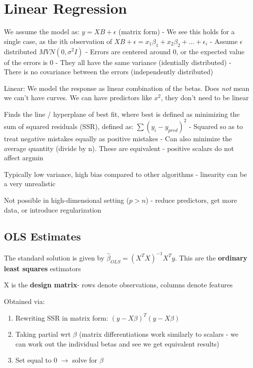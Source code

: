 \documentclass{article}
\begin{document}
\section{Linear Regression}

We assume the model as: $y = XB + \epsilon$ (matrix form)
	- We see this holds for a single case, as the ith observation of $XB + \epsilon = x_1 \beta_1 + x_2 \beta_2 + \ldots + \epsilon_i$
	- Assume $\epsilon$ distributed $MVN(0, \sigma^2 I)$
		- Errors are centered around 0, or the expected value of the errors is 0
		- They all have the same variance (identially distributed)
		- There is no covariance between the errors (independently distributed)

Linear: We model the response as linear combination of the betas. Does \textit{not} mean we can't have curves. We can have predictors like $x^2$, they don't need to be linear

Finds the line / hyperplane of best fit, where best is defined as minimizing the sum of squared residuals (SSR), defined as: $\sum (y_i - y_{pred}) ^ 2$
	- Squared so as to treat negative mistakes equally as positive mistakes
	- Can also minimize the average quantity (divide by n). These are equivalent - positive scalars do not affect argmin 
	
Typically low variance, high bias compared to other algorithms - linearity can be a very unrealistic 

Not possible in high-dimensional setting ($p > n$) - reduce predictors, get more data, or introduce regularization
	
\subsection{OLS Estimates}
The standard solution is given by $\hat{\beta}_{OLS} = (X^T X)^{-1} X^T y$. This are the \textbf{ordinary least squares} estimators

X is the \textbf{design matrix}- rows denote observations, columns denote features

Obtained via:
\begin{enumerate}
	\item  Rewriting SSR in matrix form: $(y - X\beta)^T (y - X\beta)$
	\item Taking partial wrt $\beta$ (matrix differentiations work similarly to scalars - we can work out the individual betas and see we get equivalent results)
	\item Set equal to 0 $\rightarrow$ solve for $\beta$
\end{enumerate}
\end{document}
